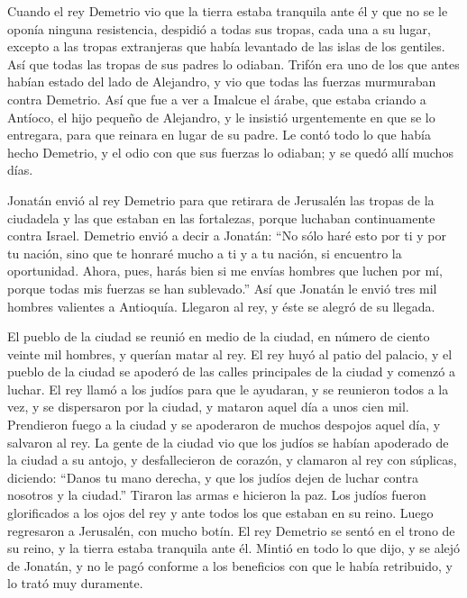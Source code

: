  Cuando el rey Demetrio vio que la tierra estaba
tranquila ante él y que no se le oponía ninguna resistencia, despidió a
todas sus tropas, cada una a su lugar, excepto a las tropas extranjeras
que había levantado de las islas de los gentiles. Así que todas las
tropas de sus padres lo odiaban.  Trifón era uno de los
que antes habían estado del lado de Alejandro, y vio que todas las
fuerzas murmuraban contra Demetrio. Así que fue a ver a Imalcue el
árabe, que estaba criando a Antíoco, el hijo pequeño de Alejandro,
 y le insistió urgentemente en que se lo entregara, para
que reinara en lugar de su padre. Le contó todo lo que había hecho
Demetrio, y el odio con que sus fuerzas lo odiaban; y se quedó allí
muchos días.

 Jonatán envió al rey Demetrio para que retirara de
Jerusalén las tropas de la ciudadela y las que estaban en las
fortalezas, porque luchaban continuamente contra Israel. 
Demetrio envió a decir a Jonatán: ``No sólo haré esto por ti y por tu
nación, sino que te honraré mucho a ti y a tu nación, si encuentro la
oportunidad.  Ahora, pues, harás bien si me envías
hombres que luchen por mí, porque todas mis fuerzas se han sublevado.''
 Así que Jonatán le envió tres mil hombres valientes a
Antioquía. Llegaron al rey, y éste se alegró de su llegada.

 El pueblo de la ciudad se reunió en medio de la ciudad,
en número de ciento veinte mil hombres, y querían matar al rey.
 El rey huyó al patio del palacio, y el pueblo de la
ciudad se apoderó de las calles principales de la ciudad y comenzó a
luchar.  El rey llamó a los judíos para que le ayudaran,
y se reunieron todos a la vez, y se dispersaron por la ciudad, y mataron
aquel día a unos cien mil.  Prendieron fuego a la ciudad
y se apoderaron de muchos despojos aquel día, y salvaron al rey.
 La gente de la ciudad vio que los judíos se habían
apoderado de la ciudad a su antojo, y desfallecieron de corazón, y
clamaron al rey con súplicas, diciendo:  ``Danos tu mano
derecha, y que los judíos dejen de luchar contra nosotros y la ciudad.''
 Tiraron las armas e hicieron la paz. Los judíos fueron
glorificados a los ojos del rey y ante todos los que estaban en su
reino. Luego regresaron a Jerusalén, con mucho botín.  El
rey Demetrio se sentó en el trono de su reino, y la tierra estaba
tranquila ante él.  Mintió en todo lo que dijo, y se
alejó de Jonatán, y no le pagó conforme a los beneficios con que le
había retribuido, y lo trató muy duramente.

